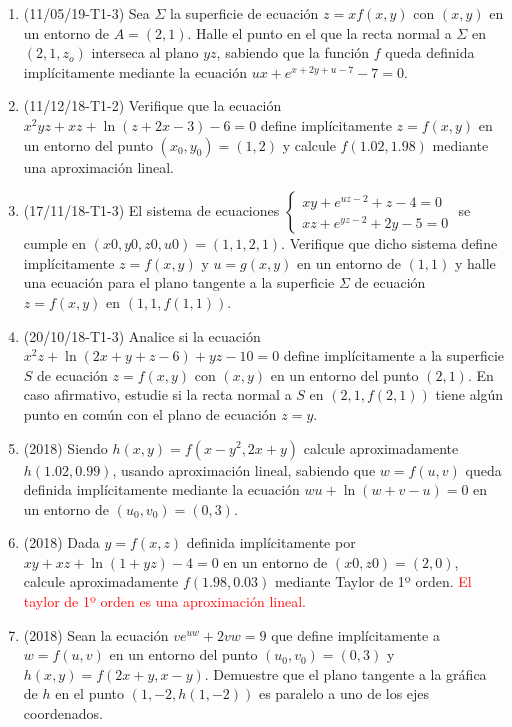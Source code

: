 \documentclass[12pt,a4paper]{article}
\newcommand{\red}[1]{\textcolor{red}{#1}}
\begin{document}
\begin{enumerate}
	\item (11/05/19-T1-3) Sea $\Sigma$ la superficie de ecuación $z = x f ( x , y )$ con $( x , y )$ en un entorno de $A = ( 2 , 1 ) $. Halle el punto en el que la recta normal a $\Sigma$ en $ ( 2 , 1 , z_o ) $ interseca al plano $ yz $, sabiendo que la función $f$ queda definida implícitamente mediante la ecuación $u x + e^{x + 2 y + u - 7} - 7 = 0 $.
	 
	\item (11/12/18-T1-2) Verifique que la ecuación $ x^2 y z + x z + \ln ( z + 2 x - 3 ) - 6 = 0 $ define implícitamente $z = f ( x , y )$ en un entorno del punto $( x_0 , y_0 ) = ( 1 , 2 )$ y calcule $f ( 1 . 02 , 1 . 98 )$ mediante una aproximación lineal.
	
	\item (17/11/18-T1-3) El sistema de ecuaciones $\begin{cases}
		x y + e^{u z - 2} + z  - 4 = 0 \\
		x z + e^{y z - 2} + 2y - 5 = 0
	\end{cases}$ se cumple en $( x 0 , y 0 , z 0 , u 0 ) = ( 1 , 1 , 2 , 1 ) $. Verifique que dicho sistema define implícitamente $z = f ( x , y )$ y $u = g ( x , y )$ en un entorno de $( 1 , 1 )$	y halle una ecuación para el plano tangente a la superficie $\Sigma$ de ecuación $z = f ( x , y )$ en $( 1 , 1 , f ( 1 , 1 )) $.
	
	\item (20/10/18-T1-3) Analice si la ecuación $x^2 z + \ln( 2 x + y + z - 6 ) + y z - 10 = 0$ define implícitamente a la superficie $S$ de ecuación $z = f ( x , y )$ con $( x , y )$ en un entorno del punto $( 2 , 1 )$. En caso afirmativo, estudie si la recta normal a $S$ en $( 2 , 1 , f ( 2 , 1 ))$ tiene algún punto en común con el plano de ecuación $z = y $.
	
	\item (2018) Siendo $h(x, y) = f(x - y^2 , 2 x + y)$ calcule aproximadamente $h(1.02, 0.99)$, usando aproximación lineal, sabiendo que $w = f(u, v)$ queda definida implícitamente mediante la ecuación $w u + \ln(w + v - u) = 0$ en un entorno de $(u_0 , v_0 ) = (0, 3)$.
	
	\item (2018) Dada $y = f(x, z)$ definida implícitamente por $x y + x z + \ln(1 + y z) - 4 = 0$ en un entorno	de $(x 0 , z 0 ) = (2, 0) $, calcule aproximadamente $f(1.98, 0.03)$ mediante Taylor de 1º orden. \red{El taylor de 1º orden es una aproximación lineal.}
	
	\item (2018) Sean la ecuación $v e^{u w} + 2 v w = 9$ que define implícitamente a $w = f(u, v)$ en un entorno del punto $(u_0 , v_0) = (0, 3)$ y $h(x, y) = f(2 x + y , x - y) $. Demuestre que el plano tangente a la gráfica de $h$ en el punto $(1, -2, h(1, -2))$ es paralelo a uno de los ejes coordenados.
\end{enumerate}
\end{document}
